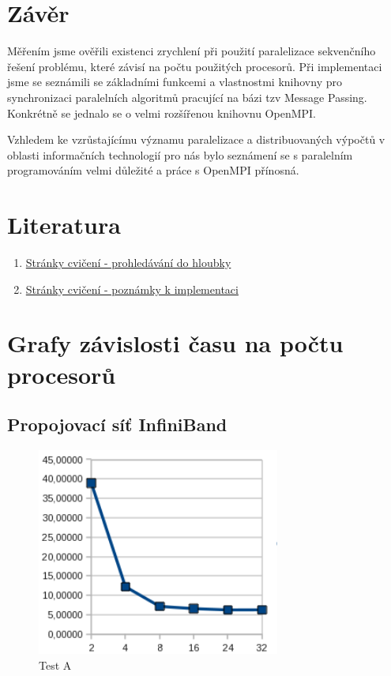 \documentclass[12pt]{article}
\begin{document}
\section{Závěr}
Měřením jsme ověřili existenci zrychlení při použití paralelizace sekvenčního řešení problému, které
závisí na počtu použitých procesorů.
Při implementaci jsme se seznámili se základními funkcemi a vlastnostmi knihovny pro synchronizaci paralelních algoritmů
pracující na bázi tzv Message Passing. Konkrétně se jednalo se o velmi rozšířenou knihovnu OpenMPI.

Vzhledem ke vzrůstajícímu významu paralelizace a distribuovaných výpočtů v oblasti informačních technologií
pro nás bylo seznámení se s paralelním programováním velmi důležité a práce s OpenMPI přínosná.
\section{Literatura}
\begin{enumerate}
\item \href{https://edux.fit.cvut.cz/courses/MI-PAR/labs/prohledavani_do_hloubky}{Stránky cvičení - prohledávání do hloubky}
\item \href{https://edux.fit.cvut.cz/courses/MI-PAR/labs/poznamky_k_implementaci}{Stránky cvičení - poznámky k implementaci}
\end{enumerate}


\appendix
\section{Grafy závislosti času na počtu procesorů}
\subsection{Propojovací síť InfiniBand}
\begin{figure}[h]
\begin{center}
\includegraphics[width=8cm]{grafy-zprava/testAinfib.png}
\caption{Test A}
\label{fig:testAinfib}
\end{center}
\end{figure}
\end{document}
